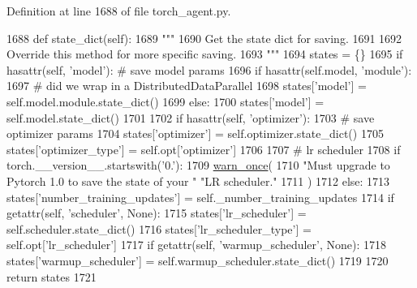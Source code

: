 Definition at line 1688 of file torch\+\_\+agent.\+py.


\begin{DoxyCode}
1688     \textcolor{keyword}{def }state\_dict(self):
1689         \textcolor{stringliteral}{"""}
1690 \textcolor{stringliteral}{        Get the state dict for saving.}
1691 \textcolor{stringliteral}{}
1692 \textcolor{stringliteral}{        Override this method for more specific saving.}
1693 \textcolor{stringliteral}{        """}
1694         states = \{\}
1695         \textcolor{keywordflow}{if} hasattr(self, \textcolor{stringliteral}{'model'}):  \textcolor{comment}{# save model params}
1696             \textcolor{keywordflow}{if} hasattr(self.model, \textcolor{stringliteral}{'module'}):
1697                 \textcolor{comment}{# did we wrap in a DistributedDataParallel}
1698                 states[\textcolor{stringliteral}{'model'}] = self.model.module.state\_dict()
1699             \textcolor{keywordflow}{else}:
1700                 states[\textcolor{stringliteral}{'model'}] = self.model.state\_dict()
1701 
1702         \textcolor{keywordflow}{if} hasattr(self, \textcolor{stringliteral}{'optimizer'}):
1703             \textcolor{comment}{# save optimizer params}
1704             states[\textcolor{stringliteral}{'optimizer'}] = self.optimizer.state\_dict()
1705             states[\textcolor{stringliteral}{'optimizer\_type'}] = self.opt[\textcolor{stringliteral}{'optimizer'}]
1706 
1707         \textcolor{comment}{# lr scheduler}
1708         \textcolor{keywordflow}{if} torch.\_\_version\_\_.startswith(\textcolor{stringliteral}{'0.'}):
1709             \hyperlink{namespaceparlai_1_1utils_1_1misc_a884a3aefa90581f53bc592fa6a78dc43}{warn\_once}(
1710                 \textcolor{stringliteral}{"Must upgrade to Pytorch 1.0 to save the state of your "} \textcolor{stringliteral}{"LR scheduler."}
1711             )
1712         \textcolor{keywordflow}{else}:
1713             states[\textcolor{stringliteral}{'number\_training\_updates'}] = self.\_number\_training\_updates
1714             \textcolor{keywordflow}{if} getattr(self, \textcolor{stringliteral}{'scheduler'}, \textcolor{keywordtype}{None}):
1715                 states[\textcolor{stringliteral}{'lr\_scheduler'}] = self.scheduler.state\_dict()
1716                 states[\textcolor{stringliteral}{'lr\_scheduler\_type'}] = self.opt[\textcolor{stringliteral}{'lr\_scheduler'}]
1717             \textcolor{keywordflow}{if} getattr(self, \textcolor{stringliteral}{'warmup\_scheduler'}, \textcolor{keywordtype}{None}):
1718                 states[\textcolor{stringliteral}{'warmup\_scheduler'}] = self.warmup\_scheduler.state\_dict()
1719 
1720         \textcolor{keywordflow}{return} states
1721 
\end{DoxyCode}
\mbox{\label{classparlai_1_1core_1_1torch__agent_1_1TorchAgent_a8ba9d535736c0af100d00c5e7b02b61b}} 
